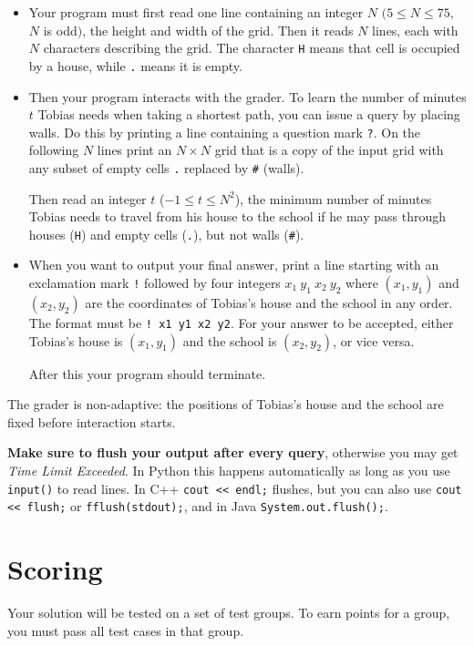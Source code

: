 \begin{itemize}
  \item Your program must first read one line containing an integer $N$ $(5 \le N \le 75,$ $N$ is odd$)$, the height and width of the grid.
  Then it reads $N$ lines, each with $N$ characters describing the grid.
  The character \texttt{H} means that cell is occupied by a house, while \texttt{.} means it is empty.

  \item Then your program interacts with the grader.
  To learn the number of minutes $t$ Tobias needs when taking a shortest path, you can issue a query by placing walls.
  Do this by printing a line containing a question mark \texttt{?}.
  On the following $N$ lines print an $N \times N$ grid that is a copy of the input grid with any subset of empty cells \texttt{.} replaced by \texttt{\#} (walls).

  Then read an integer $t$ ($-1 \le t \le N^2$), the minimum number of minutes Tobias needs to travel from his house to the school if he may pass through houses (\texttt{H}) and empty cells (\texttt{.}), but not walls (\texttt{\#}).

  \item When you want to output your final answer, print a line starting with an exclamation mark \texttt{!} followed by four integers $x_1\ y_1\ x_2\ y_2$ where $(x_1,y_1)$ and $(x_2,y_2)$ are the coordinates of Tobias's house and the school in any order.
  The format must be \texttt{! x1 y1 x2 y2}.
  For your answer to be accepted, either Tobias's house is $(x_1,y_1)$ and the school is $(x_2,y_2)$, or vice versa.

  After this your program should terminate.
\end{itemize}

The grader is non-adaptive: the positions of Tobias's house and the school are fixed before interaction starts.

\textbf{Make sure to flush your output after every query}, otherwise you may get \textit{Time Limit Exceeded}.
In Python this happens automatically as long as you use \texttt{input()} to read lines.
In C++ \texttt{cout << endl;} flushes, but you can also use \texttt{cout << flush;} or \texttt{fflush(stdout);},
and in Java \texttt{System.out.flush();}.

\section*{Scoring}
Your solution will be tested on a set of test groups.
To earn points for a group, you must pass all test cases in that group.

